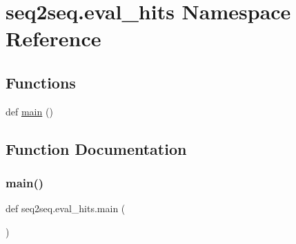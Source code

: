 \hypertarget{namespaceseq2seq_1_1eval__hits}{}\section{seq2seq.\+eval\+\_\+hits Namespace Reference}
\label{namespaceseq2seq_1_1eval__hits}
\subsection*{Functions}
\begin{DoxyCompactItemize}
\item 
def \hyperlink{namespaceseq2seq_1_1eval__hits_a6cc44d7d896f1429f58e24fb6e78a8c8}{main} ()
\end{DoxyCompactItemize}


\subsection{Function Documentation}
\mbox{\label{namespaceseq2seq_1_1eval__hits_a6cc44d7d896f1429f58e24fb6e78a8c8}} 
\subsubsection{\texorpdfstring{main()}{main()}}
{\footnotesize\ttfamily def seq2seq.\+eval\+\_\+hits.\+main (\begin{DoxyParamCaption}{ }\end{DoxyParamCaption})}

